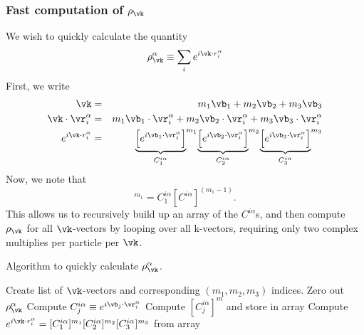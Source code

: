 \subsubsection{Fast computation of $\rho_\vk$}
We wish to quickly calculate the quantity
\begin{equation}
\rho_\vk^\alpha \equiv \sum_i e^{i\vk \cdot r_i^\alpha}
\end{equation}
First, we write 
\begin{eqnarray}
\vk & = & m_1 \vb_1 + m_2 \vb_2 + m_3 \vb_3 \\
\vk \cdot \vr_i^\alpha & = &  m_1 \vb_1 \cdot \vr_i^\alpha + 
m_2 \vb_2 \cdot \vr_i^\alpha + m_3 \vb_3 \cdot \vr_i^\alpha \\
e^{i\vk \cdot r_i^\alpha} & = & 
{\underbrace{\left[e^{i \vb_1 \cdot\vr_i^\alpha}\right]}_{C^{i\alpha}_1}}^{m_1}
{\underbrace{\left[e^{i \vb_2 \cdot\vr_i^\alpha}\right]}_{C^{i\alpha}_2}}^{m_2}
{\underbrace{\left[e^{i \vb_3 \cdot\vr_i^\alpha}\right]}_{C^{i\alpha}_3}}^{m_3}
\end{eqnarray}
Now, we note that
\begin{equation}
[C^{i\alpha}_1]^{m_1} = C^{i\alpha}_1 [C^{i\alpha}]^{(m_1-1)}.
\end{equation}
This allows us to recursively build up an array of the $C^{i\alpha}$s,
and then compute $\rho_\vk$ for all $\vk$-vectors by looping over all
k-vectors, requiring only two complex multiplies per particle per
$\vk$.
\begin{algorithm}
\caption{Algorithm to quickly calculate $\rho_\vk^\alpha$.}
\begin{algorithmic}
\STATE Create list of $\vk$-vectors and corresponding $(m_1, m_2,
m_3)$ indices.
  \STATE Zero out $\rho_\vk^\alpha$
      \STATE Compute $C^{i \alpha}_j \equiv e^{i \vb_j \cdot
        \vr^{\alpha}_i}$
         \STATE Compute $[C^{i \alpha}_j]^m$ and store in array
       \ENDFOR
    \ENDFOR
       \STATE Compute $e^{i \vk \cdot r^\alpha_i} =
         [C^{i\alpha}_1]^{m_1} [C^{i\alpha}_2]^{m_2}
         [C^{i\alpha}_3]^{m_3}$ from array
    \ENDFOR
  \ENDFOR
\ENDFOR
\end{algorithmic}
\end{algorithm}

